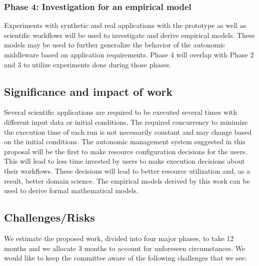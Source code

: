 \subsubsection{Phase 4: Investigation for an empirical model}

Experiments with synthetic and real applications with the prototype as well as 
scientific workflows will be used to investigate and derive empirical models. 
These models may be used to further generalize the behavior of the autonomic 
middleware based on application requirements. Phase 4 will overlap with Phase 2 
and 3 to utilize experiments done during those phases.

\subsection{Significance and impact of work}
Several scientific applications are required to be executed several times with 
different input data or initial conditions. The required concurrency to minimize 
the execution time of each run is not necessarily constant and may change based 
on the initial conditions. The autonomic management system suggested in this 
proposal will be the first to make resource configuration decisions for the users. 
This will lead to less time invested by users to make execution decisions about 
their workflows. These decisions will lead to better resource utilization and, 
as a result, better domain science. The empirical models derived by this work can 
be used to derive formal mathematical models.

\subsection{Challenges/Risks}

We estimate the proposed work, divided into four major phases, to take 12 months 
and we allocate 3 months to account for unforeseen circumstances. We would like 
to keep the committee aware of the following challenges that we see:

